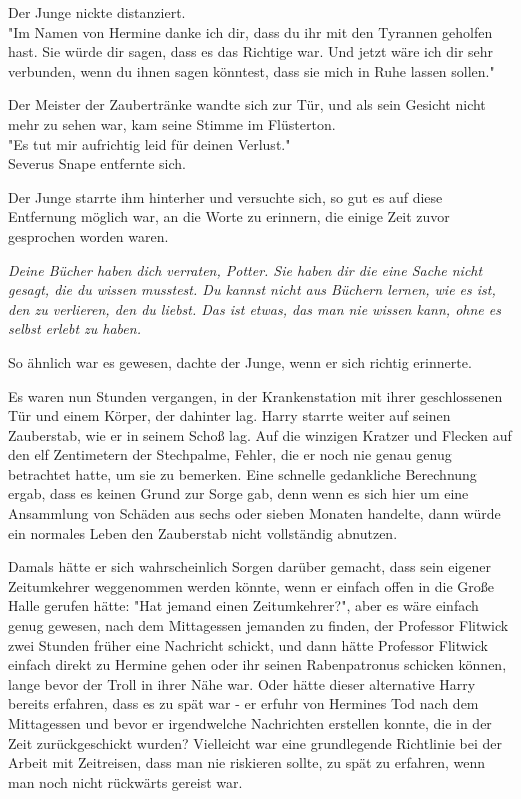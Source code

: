 {Der Junge nickte distanziert.\\ "Im Namen von Hermine danke ich dir, dass du ihr mit den Tyrannen geholfen hast. Sie würde dir sagen, dass es das Richtige war. Und jetzt wäre ich dir sehr verbunden, wenn du ihnen sagen könntest, dass sie mich in Ruhe lassen sollen."

Der Meister der Zaubertränke wandte sich zur Tür, und als sein Gesicht nicht mehr zu sehen war, kam seine Stimme im Flüsterton.\\ "Es tut mir aufrichtig leid für deinen Verlust."\\ Severus Snape entfernte sich.

Der Junge starrte ihm hinterher und versuchte sich, so gut es auf diese Entfernung möglich war, an die Worte zu erinnern, die einige Zeit zuvor gesprochen worden waren.

\emph{Deine Bücher haben dich verraten, Potter. Sie haben dir die eine Sache nicht gesagt, die du wissen musstest. Du kannst nicht aus Büchern lernen, wie es ist, den zu verlieren, den du liebst. Das ist etwas, das man nie wissen kann, ohne es selbst erlebt zu haben.}

So ähnlich war es gewesen, dachte der Junge, wenn er sich richtig erinnerte.

Es waren nun Stunden vergangen, in der Krankenstation mit ihrer geschlossenen Tür und einem Körper, der dahinter lag. Harry starrte weiter auf seinen Zauberstab, wie er in seinem Schoß lag. Auf die winzigen Kratzer und Flecken auf den elf Zentimetern der Stechpalme, Fehler, die er noch nie genau genug betrachtet hatte, um sie zu bemerken. Eine schnelle gedankliche Berechnung ergab, dass es keinen Grund zur Sorge gab, denn wenn es sich hier um eine Ansammlung von Schäden aus sechs oder sieben Monaten handelte, dann würde ein normales Leben den Zauberstab nicht vollständig abnutzen.

Damals hätte er sich wahrscheinlich Sorgen darüber gemacht, dass sein eigener Zeitumkehrer weggenommen werden könnte, wenn er einfach offen in die Große Halle gerufen hätte: "Hat jemand einen Zeitumkehrer?", aber es wäre einfach genug gewesen, nach dem Mittagessen jemanden zu finden, der Professor Flitwick zwei Stunden früher eine Nachricht schickt, und dann hätte Professor Flitwick einfach direkt zu Hermine gehen oder ihr seinen Rabenpatronus schicken können, lange bevor der Troll in ihrer Nähe war. Oder hätte dieser alternative Harry bereits erfahren, dass es zu spät war - er erfuhr von Hermines Tod nach dem Mittagessen und bevor er irgendwelche Nachrichten erstellen konnte, die in der Zeit zurückgeschickt wurden? Vielleicht war eine grundlegende Richtlinie bei der Arbeit mit Zeitreisen, dass man nie riskieren sollte, zu spät zu erfahren, wenn man noch nicht rückwärts gereist war.

}
